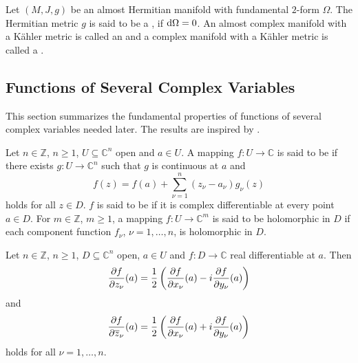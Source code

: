 \begin{definition}
Let $(M,J,g)$ be an almost Hermitian manifold with fundamental $2$-form $\Omega$. The Hermitian metric $g$ is said to be a , if $\mathop{}\!\mathrm{d} \Omega = 0$. An almost complex manifold with a K\"ahler metric is called an  and a complex manifold with a K\"ahler metric is called a .
\label{def:kaehler}
\end{definition}

\begin{appendix}
\section{Functions of Several Complex Variables}
This section summarizes the fundamental properties of functions of several complex variables needed later. The results are inspired by \cite[14--30]{grauert:complex_manifolds:2010}.

\begin{definition}
Let $n \in \mathbb{Z}$, $n \geq 1$, $U \subseteq \mathbb{C}^n$ open and $a \in U$. A mapping $f : U \to \mathbb{C}$ is said to be  if there exists $g : U \to \mathbb{C}^n$ such that $g$ is continuous at $a$ and
\begin{equation}
f(z) = f(a) + \sum_{\nu = 1}^n(z_\nu - a_\nu)g_\nu(z)
\end{equation} 
\noindent holds for all $z \in D$. $f$ is said to be  if it is complex differentiable at every point $a \in D$. For $m \in \mathbb{Z}$, $m \geq 1$, a mapping $f : U \to \mathbb{C}^m$ is said to be holomorphic in $D$ if each component function $f_\nu$, $\nu = 1,\dots,n$, is holomorphic in $D$.
\label{def:holomorphic}
\end{definition}

\begin{proposition}
Let $n \in \mathbb{Z}$, $n \geq 1$, $D \subseteq \mathbb{C}^n$ open, $a \in U$ and $f : D \to \mathbb{C}$ real differentiable at $a$. Then
\begin{equation}
\frac{\partial f}{\partial z_\nu}(a) = \frac{1}{2}\del[3]{\frac{\partial f}{\partial x_\nu}(a) - i \frac{\partial f}{\partial y_\nu}(a)} 
\end{equation}
\noindent and
\begin{equation}
\frac{\partial f}{\partial \overline{z}_\nu}(a) = \frac{1}{2}\del[3]{\frac{\partial f}{\partial x_\nu}(a) + i \frac{\partial f}{\partial y_\nu}(a)}
\end{equation}  
\noindent holds for all $\nu = 1,\dots,n$.
\label{prop:Wirtinger}
\end{proposition}


\end{appendix}
